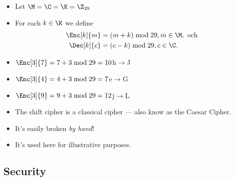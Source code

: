 \begin{frame}
  \begin{definition}\label{ShiftCipher}
    \begin{itemize}
      \item Let \(\M = \C = \K = \Z_{29}\)
      \item For each \(k\in \K\) we define
        \begin{align}
          \nonumber
          \Enc[k]{m} &= (m + k) \bmod 29, m\in \M, \text{\ och } \\
          \nonumber
          \Dec[k]{c} &= (c - k) \bmod 29, c\in \C.
        \end{align}
    \end{itemize}
  \end{definition}

  \pause{}

  \begin{example}
    \begin{itemize}
      \item \(\Enc[3]{7} = 7+3 \bmod 29 = 10\)\hfill h\(\to\)J
      \item \(\Enc[3]{4} = 4+3 \bmod 29 = 7\)\hfill e\(\to\)G
      \item \(\Enc[3]{9} = 9+3 \bmod 29 = 12\)\hfill j\(\to\)L
    \end{itemize}
  \end{example}
\end{frame}

\begin{frame}
  \begin{remark}
    \begin{itemize}
      \item The shift cipher is a classical cipher --- also know as the Caesar 
        Cipher.
      \item It's easily broken \emph{by hand}!
      \item It's used here for illustrative purposes.
    \end{itemize}
  \end{remark}
\end{frame}

\subsection{Security}

